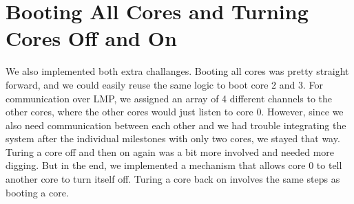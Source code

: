 \section{Booting All Cores and Turning Cores Off and On}
We also implemented both extra challanges. Booting all cores was pretty straight
forward, and we could easily reuse the same logic to boot core 2 and 3. 
For communication over LMP, we assigned an array of 4 different channels to the other cores,
where the other cores would just listen to core 0. However, since we also need communication
between each other and we had trouble integrating the system after the individual milestones
with only two cores, we stayed that way. 
Turing a core off and then on again was a bit more involved and needed more digging. But
in the end, we implemented a mechanism that allows core 0 to tell another core
to turn itself off. Turing a core back on involves the same steps as booting a
core.



